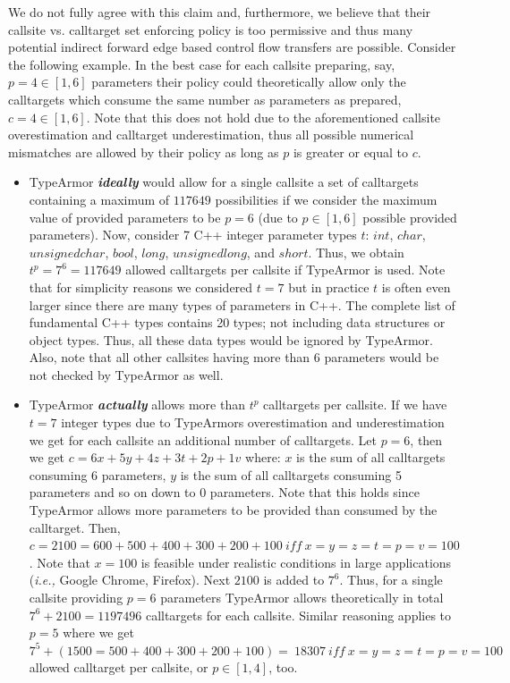We do not fully agree with this claim and, furthermore, we believe that their callsite vs. calltarget set enforcing policy is too permissive and thus many potential indirect forward edge based control flow transfers are possible. Consider the following example. In the best case for each callsite preparing, say, $p=4 \in [1, 6]$ parameters their policy could theoretically allow only the calltargets which consume the same number as parameters as prepared, $c=4 \in [1, 6]$. Note that this does not hold due to 
the aforementioned callsite overestimation and calltarget underestimation, thus all possible numerical mismatches are allowed by their policy as long as $p$ is greater or equal to $c$.

\begin{itemize}
[leftmargin=.12in]
\item TypeArmor \textbf{\textit{ideally}} would allow for a single callsite a set of calltargets containing a maximum of $117649$ possibilities if we consider the maximum value of provided parameters to be $p=6$ (due to $p \in [1, 6]$ possible provided parameters). Now, consider 7 C++ integer parameter types $t$: $int$, $char$, $unsigned char$, $bool$, $long$, $unsigned long$, and $short$. Thus, we obtain $t^{p}=7^{6}=117649$ allowed calltargets per callsite if TypeArmor is used. Note that for simplicity reasons we considered $t=7$ but in practice $t$ is often even larger since there are many types of parameters in C++. The complete list of fundamental C++ types contains 20 types; not including data structures or object types. Thus, all these data types would be ignored by TypeArmor. Also, note that all other callsites having more than 6 parameters would be not checked by TypeArmor as well.

\item TypeArmor \textbf{\textit{actually}} allows more than $t^{p}$ calltargets per callsite. If we have $t=7$ integer types due to TypeArmors overestimation and underestimation we get for each callsite an additional number of calltargets. Let $p=6$, then we get $c = 6x + 5y+ 4z + 3t + 2p + 1v$ where:
$x$ is the sum of all calltargets consuming 6 parameters, 
$y$ is the sum of all calltargets consuming 5 parameters 
and so on down to 0 parameters. Note that this holds since TypeArmor allows more parameters to be provided than consumed by the calltarget.
Then, $c = 2100 = 600 + 500 + 400 + 300 + 200 + 100 \ iff \ x=y=z=t=p=v=100$. 
Note that $x=100$ is feasible under realistic conditions in large applications (\textit{i.e.,} Google Chrome, Firefox). 
Next $2100$ is added to $7^{6}$. Thus, for a single callsite providing $p=6$ parameters TypeArmor allows theoretically in 
total $7^{6} + 2100 = 1197496$ calltargets for each callsite.
Similar reasoning applies to $p=5$ where we get $7^{5} + (1500 = 500 + 400 + 300 + 200 + 100) = \ 18307 \ iff \ x=y=z=t=p=v=100$ 
allowed calltarget per callsite, or $p \in [1, 4]$, too.
\end{itemize}

